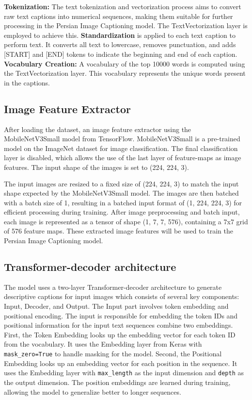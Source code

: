 \documentclass[runningheads]{llncs}
\begin{document}
\textbf{Tokenization:}
The text tokenization and vectorization process aims to convert raw text captions into numerical sequences, making them suitable for further processing in the Persian Image Captioning model. The TextVectorization layer is employed to achieve this. \textbf{Standardization} is applied to each text caption to perform text. It converts all text to lowercase, removes punctuation, and adds [START] and [END] tokens to indicate the beginning and end of each caption.
\textbf{Vocabulary Creation:}
A vocabulary of the top 10000 words is computed using the TextVectorization layer. This vocabulary represents the unique words present in the captions.

\subsection{Image Feature Extractor}

After loading the dataset, an image feature extractor using the MobileNetV3Small model from TensorFlow. MobileNetV3Small is a pre-trained model on the ImageNet dataset for image classification. The final classification layer is disabled, which allows the use of the last layer of feature-maps as image features. The input shape of the images is set to (224, 224, 3).

The input images are resized to a fixed size of (224, 224, 3) to match the input shape expected by the MobileNetV3Small model. The images are then batched with a batch size of 1, resulting in a batched input format of (1, 224, 224, 3) for efficient processing during training. After image preprocessing and batch input, each image is represented as a tensor of shape (1, 7, 7, 576), containing a 7x7 grid of 576 feature maps. These extracted image features will be used to train the Persian Image Captioning model.

\subsection{Transformer-decoder architecture}

The model uses a two-layer Transformer-decoder architecture to generate descriptive captions for input images which consists of several key components: Input, Decoder, and Output. The Input part involves token embedding and positional encoding. The input is responsible for embedding the token IDs and positional information for the input text sequences combine two embeddings. First, the Token Embedding looks up the embedding vector for each token ID from the vocabulary. It uses the Embedding layer from Keras with \texttt{mask\_zero=True} to handle masking for the model. Second, the Positional Embedding looks up an embedding vector for each position in the sequence. It uses the Embedding layer with \texttt{max\_length} as the input dimension and \texttt{depth} as the output dimension. The position embeddings are learned during training, allowing the model to generalize better to longer sequences.
\end{document}
